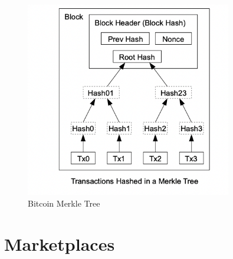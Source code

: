 %
\begin{figure}[ht!]
\centering
\includegraphics[width=90mm]{MerkleTree.png}
\caption{Bitcoin Merkle Tree \cite{N08}}
\label{overflow}
\end{figure}



    
    

    



\section{Marketplaces}

